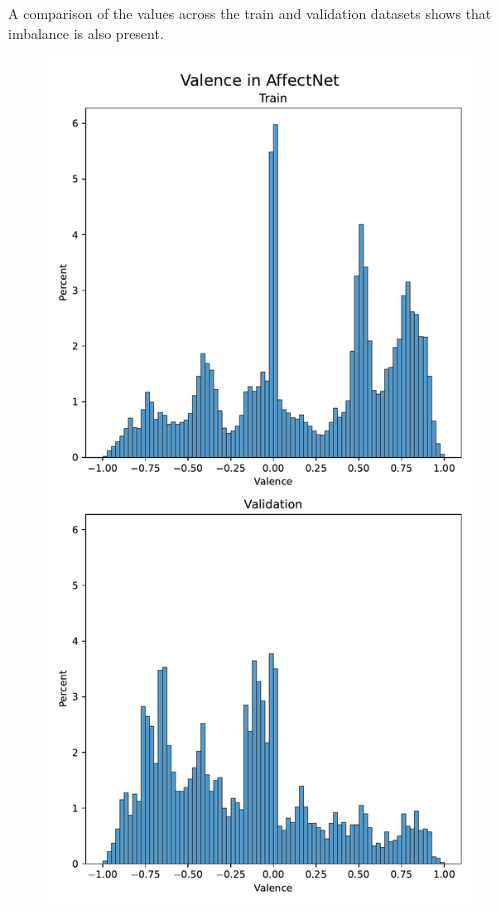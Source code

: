 A comparison of the \va{} values across the train and validation datasets shows that imbalance is also present.
\begin{figure}
    \centering
    \includegraphics[width=0.65\columnwidth]{pictures/affectnet/valence_distribution.pdf}

\end{figure}
